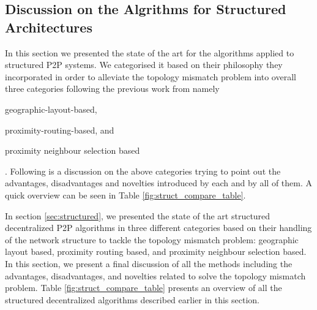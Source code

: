 \documentclass[acmcsur,acmnow]{acmtrans2m}
\begin{document}
\subsection{Discussion on the Algrithms for Structured Architectures}
In this section we presented the state of the art for the algorithms applied to structured P2P systems. We categorised it based on their philosophy they incorporated in order to alleviate the topology mismatch problem into overall three categories following the previous work from \cite{castro_proximitydht_2002,castro_topawareroute_2002,ratnasamy_openq_2002} namely
\begin{inparaenum}
  \item geographic-layout-based,
  \item proximity-routing-based, and
  \item proximity neighbour selection based
\end{inparaenum}
. Following is a discussion on the above categories trying to point out the advantages, disadvantages and novelties introduced by each and by all of them. A quick overview can be seen in Table \ref{fig:struct_compare_table}.


In section \ref{sec:structured},  we presented the state of the art structured
decentralized P2P algorithms in three different categories based on their
handling of the network structure to tackle the topology mismatch problem:
geographic layout based, proximity routing based, and proximity neighbour
selection based. In this section, we present a final discussion of all the
methods including the advantages, disadvantages,
and novelties related to solve the topology mismatch problem.
Table \ref{fig:struct_compare_table} presents an overview of all the
structured decentralized algorithms described earlier in this section.
\end{document}

